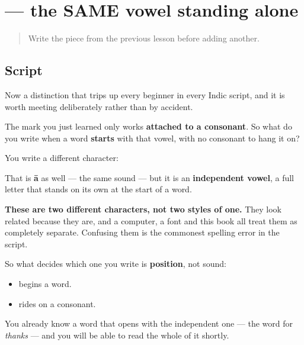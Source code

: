 \section[\texorpdfstring{\gu{આ} (ā)}{આ (ā)}]{ — the SAME vowel standing alone}

\label{lesson:GU-W01-aa}



\begin{quote}
Write the piece from the previous lesson before adding another.
\end{quote}

\subsection*{Script}

Now a distinction that trips up every beginner in every Indic script, and it is worth meeting deliberately rather than by accident.

The mark you just learned only works \textbf{attached to a consonant}. So what do you write when a word \textbf{starts} with that vowel, with no consonant to hang it on?

You write a different character:

\begin{quote}
\end{quote}

That is \textbf{ā} as well — the same sound — but it is an \textbf{independent vowel}, a full letter that stands on its own at the start of a word.

\textbf{These are two different characters, not two styles of one.} They look related because they are, and a computer, a font and this book all treat them as completely separate. Confusing them is the commonest spelling error in the script.

So what decides which one you write is \textbf{position}, not sound:

\begin{itemize}
\raggedright
  \item \textbf{} begins a word.
  \item \textbf{} rides on a consonant.
\end{itemize}

You already know a word that opens with the independent one — the word for \emph{thanks} — and you will be able to read the whole of it shortly.


